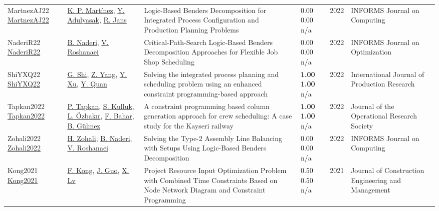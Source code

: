 {\begin{longtable}{p{3cm}p{5cm}p{10cm}p{1cm}rp{2.5cm}l}
MartnezAJ22 \href{http://dx.doi.org/10.1287/ijoc.2021.1079}{MartnezAJ22} & \hyperref[auth:a934]{K. P. Martínez}, \hyperref[auth:a935]{Y. Adulyasak}, \hyperref[auth:a840]{R. Jans} & Logic-Based Benders Decomposition for Integrated Process Configuration and Production Planning Problems & \noindent{}\textcolor{black!50}{0.00} \textcolor{black!50}{0.00} n/a & 2022 & \cellcolor{red!20}INFORMS Journal on Computing & \cite{MartnezAJ22}\\
NaderiR22 \href{http://dx.doi.org/10.1287/ijoo.2021.0056}{NaderiR22} & \hyperref[auth:a725]{B. Naderi}, \hyperref[auth:a727]{V. Roshanaei} & Critical-Path-Search Logic-Based Benders Decomposition Approaches for Flexible Job Shop Scheduling & \noindent{}\textcolor{black!50}{0.00} \textcolor{black!50}{0.00} n/a & 2022 & \cellcolor{red!20}INFORMS Journal on Optimization & \cite{NaderiR22}\\
ShiYXQ22 \href{https://doi.org/10.1080/00207543.2021.1963496}{ShiYXQ22} & \hyperref[auth:a445]{G. Shi}, \hyperref[auth:a446]{Z. Yang}, \hyperref[auth:a447]{Y. Xu}, \hyperref[auth:a448]{Y. Quan} & Solving the integrated process planning and scheduling problem using an enhanced constraint programming-based approach & \noindent{}\textbf{1.00} \textbf{1.00} n/a & 2022 & \cellcolor{red!20}International Journal of Production Research & \cite{ShiYXQ22}\\
Tapkan2022 \href{http://dx.doi.org/10.1080/01605682.2022.2125843}{Tapkan2022} & \hyperref[auth:a1784]{P. Tapkan}, \hyperref[auth:a1785]{S. Kulluk}, \hyperref[auth:a1786]{L. Özbakır}, \hyperref[auth:a1787]{F. Bahar}, \hyperref[auth:a1788]{B. Gülmez} & A constraint programming based column generation approach for crew scheduling: A case study for the Kayseri railway & \noindent{}\textbf{1.00} \textbf{1.00} n/a & 2022 & \cellcolor{red!20}Journal of the Operational Research Society & \cite{Tapkan2022}\\
Zohali2022 \href{http://dx.doi.org/10.1287/ijoc.2020.1015}{Zohali2022} & \hyperref[auth:a1524]{H. Zohali}, \hyperref[auth:a725]{B. Naderi}, \hyperref[auth:a727]{V. Roshanaei} & Solving the Type-2 Assembly Line Balancing with Setups Using Logic-Based Benders Decomposition & \noindent{}\textcolor{black!50}{0.00} \textcolor{black!50}{0.00} n/a & 2022 & \cellcolor{red!20}INFORMS Journal on Computing & \cite{Zohali2022}\\
Kong2021 \href{http://dx.doi.org/10.1061/(asce)co.1943-7862.0002192}{Kong2021} & \hyperref[auth:a1704]{F. Kong}, \hyperref[auth:a1705]{J. Guo}, \hyperref[auth:a1706]{X. Lv} & Project Resource Input Optimization Problem with Combined Time Constraints Based on Node Network Diagram and Constraint Programming & \noindent{}0.50 0.50 n/a & 2021 & Journal of Construction Engineering and Management & \cite{Kong2021}\\

\end{longtable}}
